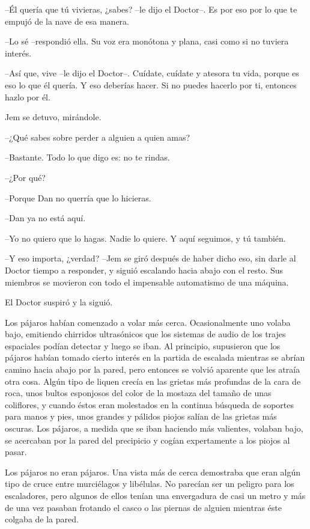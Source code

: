 {--Él quería que tú vivieras, ¿sabes? --le dijo el Doctor--. Es por eso
por lo que te empujó de la nave de esa manera.}

{--Lo sé --respondió ella. Su voz era monótona y plana, casi como si no
tuviera interés.}

{--Así que, vive --le dijo el Doctor--. Cuídate, cuídate y atesora tu
 vida, porque es eso lo que él quería. Y eso deberías hacer. Si no puedes
hacerlo por ti, entonces hazlo por él.}

{Jem se detuvo, mirándole.}

{--¿Qué sabes sobre perder a alguien a quien amas?}

{--Bastante. Todo lo que digo es: no te rindas.}

{--¿Por qué?}

{--Porque Dan no querría que lo hicieras.}

{--Dan ya no está aquí.}

{--Yo no quiero que lo hagas. Nadie lo quiere. Y aquí seguimos, y tú
también.}

{--Y eso importa, ¿verdad? --Jem se giró después de haber dicho eso, sin
 darle al Doctor tiempo a responder, y siguió escalando hacia abajo con
 el resto. Sus miembros se movieron con todo el impensable automatismo de
una máquina.}

{El Doctor suspiró y la siguió.}

{Los pájaros habían
 comenzado a volar más cerca. Ocasionalmente uno volaba bajo, emitiendo
 chirridos ultrasónicos que los sistemas de audio de los trajes
 espaciales podían detectar y luego se iban. Al principio, supusieron que
 los pájaros habían tomado cierto interés en la partida de escalada
 mientras se abrían camino hacia abajo por la pared, pero entonces se
 volvió aparente que les atraía otra cosa. Algún tipo de liquen crecía en
 las grietas más profundas de la cara de roca, unos bultos esponjosos del
 color de la mostaza del tamaño de unas coliflores, y cuando éstos eran
 molestados en la continua búsqueda de soportes para manos y pies, unos
 grandes y pálidos piojos salían de las grietas más oscuras. Los pájaros,
 a medida que se iban haciendo más valientes, volaban bajo, se acercaban
 por la pared del precipicio y cogían expertamente a los piojos al
pasar.}

{Los pájaros no eran pájaros. Una vista más de cerca demostraba que eran
 algún tipo de cruce entre murciélagos y libélulas. No parecían ser un
 peligro para los escaladores, pero algunos de ellos tenían una
 envergadura de casi un metro y más de una vez pasaban frotando el casco
o las piernas de alguien mientras éste colgaba de la pared.}

